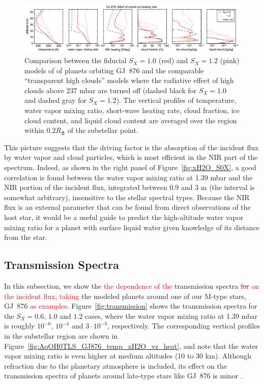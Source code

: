 \documentclass[11pt,numberedappendix,twocolappendix,]{emulateapj}
\def\preslevel{1.39 mbar}
\def\wv{water vapor}
\def\addYF#1{\textcolor{red}{#1}}
\def\changeYF#1#2{\textcolor{red}{\sout{#1} #2}}
\begin{document}
\begin{figure}[htb]
    \begin{center}
    \includegraphics[width=1\hsize]{GJ876_heat_cld.pdf}
    \end{center}
\caption{Comparison between the fiducial $S_X=1.0$ (red) and $S_X=1.2$ (pink) models of of planets orbiting GJ~876 and the comparable ``transparent high clouds'' models where the radiative effect of high clouds above 237 mbar are turned off (dashed black for $S_X=1.0$ and dashed gray for $S_X=1.2$). The vertical profiles of temperature, \wv{} mixing ratio, short-wave heating rate, cloud fraction, ice cloud content, and liquid cloud content are averaged over the region within $0.2R_\earth $ of the substellar point. }
\label{fig:GJ876_heat_cld}
\end{figure}


This picture suggests that the driving factor is the absorption of the incident flux by \wv{} and cloud particles, which is most efficient in the NIR part of the spectrum. 
Indeed, as shown in the right panel of Figure~\ref{fig:xH2O_S0X}, a good correlation is found between the \wv{} mixing ratio at \preslevel{} and the NIR portion of the incident flux, integrated between 0.9 and 3 \textmu m (the interval is somewhat arbitrary), insensitive to the stellar spectral types. 
Because the NIR flux is an external parameter that can be found from direct observations of the host star, it would be a useful guide to predict the high-altitude \wv{}  mixing ratio for a planet with surface liquid water given knowledge of its distance from the star. 


\subsection{Transmission Spectra}
\label{ss:result_TransmissionSpectra}

In this subsection, we show the \addYF{the dependence of the} transmission spectra \changeYF{for }{on the incident flux, taking} the modeled planets around one of our M-type stars, GJ~876 \addYF{as examples}. 
Figure~\ref{fig:transmission} shows the transmission spectra for the $S_X=0.6$, $1.0$ and $1.2$ cases, where the \wv{} mixing ratio at \preslevel{} is roughly $10^{-6}$, $10^{-4}$ and $3\cdot 10^{-3}$, respectively. 
The corresponding vertical profiles in the substellar region are shown in Figure~\ref{fig:AqOH0TLS_GJ876_temp_xH2O_vz_heat}, and note that the \wv{} mixing ratio is even higher at medium altitudes (10 to 30 km).
Although refraction due to the planetary atmosphere is included, its effect on the transmission spectra of planets around late-type stars like GJ~876 is minor \citep{Betremieux2014,Misra2014}. 
\end{document}

